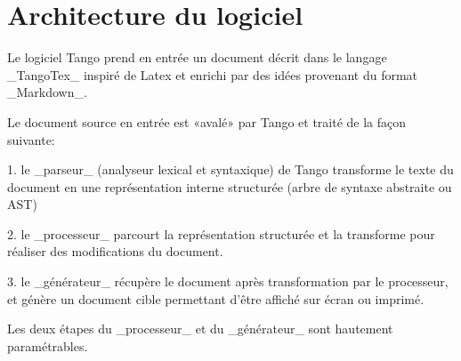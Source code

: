 
\chapter[label=chap:architecture]{Architecture du logiciel}

Le logiciel Tango prend en entrée un document décrit dans le langage _TangoTex_  inspiré de Latex et enrichi par des idées provenant du format _Markdown_.

Le document source en entrée est «avalé» par Tango et traité de la façon suivante:

  1. le _parseur_ (analyseur lexical et syntaxique) de Tango transforme le texte du document en une représentation interne structurée (arbre de syntaxe abstraite ou AST)

  2. le _processeur_ parcourt la représentation structurée et la transforme pour réaliser des modifications du document.

  3. le _générateur_ récupère le document après transformation par le processeur, et génère un document cible permettant d'être affiché sur écran ou imprimé.


Les deux étapes du _processeur_ et du _générateur_ sont hautement paramétrables.

